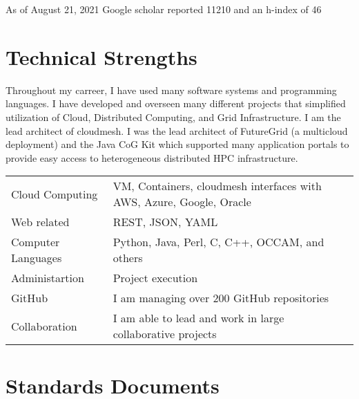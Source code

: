 \documentclass{article}
\begin{document}
As of August 21, 2021 Google scholar reported 11210 and an h-index of 46



\section{Technical Strengths}

Throughout my carreer, I have used many software systems and
programming languages.  I have developed and overseen many different
projects that simplified utilization of Cloud, Distributed Computing,
and Grid Infrastructure. I am the lead architect of cloudmesh. I was
the lead architect of FutureGrid (a multicloud deployment) and the
Java CoG Kit which supported many application portals to provide easy
access to heterogeneous distributed HPC infrastructure.

\bigskip

\begin{tabular}{ll}
Cloud Computing & VM, Containers, cloudmesh interfaces with AWS, Azure, Google, Oracle\\
Web related & REST, JSON, YAML \\
Computer Languages & Python, Java, Perl, C, C++, OCCAM, and others\\
Administartion & Project execution\\
GitHub         & I am managing over 200 GitHub repositories\\
Collaboration & I am able to lead and work in large collaborative projects\\
\end{tabular}


\section{Standards Documents}

\begin{refsegment}

  \nocite{las-2020-nist-bigdata}
  \nocite{las-2019-nist}  
  \nocite{las-2019-nist-vol8}
  \nocite{las-2001-gosv3}
  \nocite{las-2001-gosv2}  

\end{refsegment}
\end{document}
